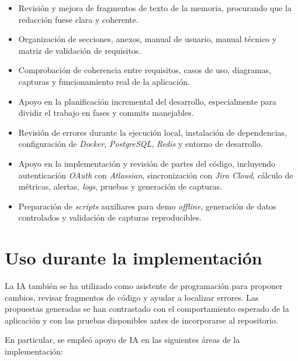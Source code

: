\begin{refsection}
\begin{itemize}
    \item Revisión y mejora de fragmentos de texto de la memoria, procurando que la redacción fuese clara y coherente.
    \item Organización de secciones, anexos, manual de usuario, manual técnico y matriz de validación de requisitos.
    \item Comprobación de coherencia entre requisitos, casos de uso, diagramas, capturas y funcionamiento real de la aplicación.
    \item Apoyo en la planificación incremental del desarrollo, especialmente para dividir el trabajo en fases y commits manejables.
    \item Revisión de errores durante la ejecución local, instalación de dependencias, configuración de \textit{Docker}, \textit{PostgreSQL}, \textit{Redis} y entorno de desarrollo.
    \item Apoyo en la implementación y revisión de partes del código, incluyendo autenticación \textit{OAuth} con \textit{Atlassian}, sincronización con \textit{Jira Cloud}, cálculo de métricas, alertas, \textit{logs}, pruebas y generación de capturas.
    \item Preparación de \textit{scripts} auxiliares para demo \textit{offline}, generación de datos controlados y validación de capturas reproducibles.
\end{itemize}

\section{Uso durante la implementación}

La IA también se ha utilizado como asistente de programación para proponer cambios, revisar fragmentos de código y ayudar a localizar errores. Las propuestas generadas se han contrastado con el comportamiento esperado de la aplicación y con las pruebas disponibles antes de incorporarse al repositorio.

En particular, se empleó apoyo de IA en las siguientes áreas de la implementación:


\end{refsection}
